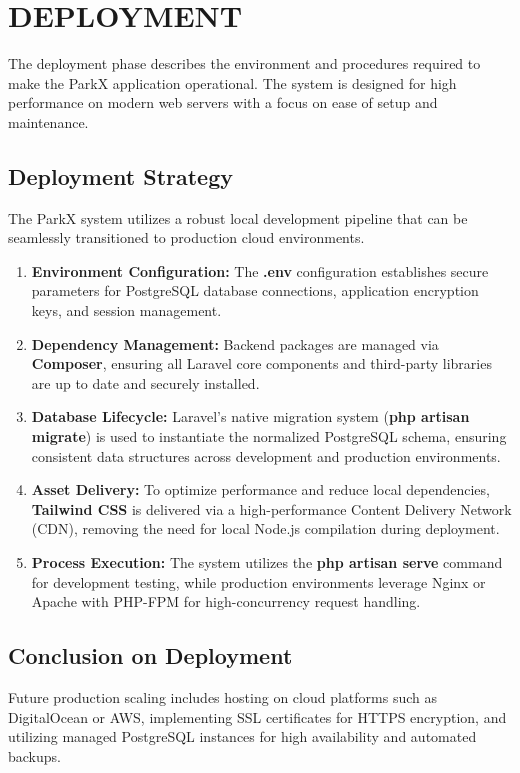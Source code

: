 \chapter{DEPLOYMENT}
The deployment phase describes the environment and procedures required to make the ParkX application operational. The system is designed for high performance on modern web servers with a focus on ease of setup and maintenance.

\section{Deployment Strategy}
The ParkX system utilizes a robust local development pipeline that can be seamlessly transitioned to production cloud environments.

\begin{enumerate}
    \item \textbf{Environment Configuration:} The \textbf{.env} configuration establishes secure parameters for PostgreSQL database connections, application encryption keys, and session management.
    \item \textbf{Dependency Management:} Backend packages are managed via \textbf{Composer}, ensuring all Laravel core components and third-party libraries are up to date and securely installed.
    \item \textbf{Database Lifecycle:} Laravel's native migration system (\textbf{php artisan migrate}) is used to instantiate the normalized PostgreSQL schema, ensuring consistent data structures across development and production environments.
    \item \textbf{Asset Delivery:} To optimize performance and reduce local dependencies, \textbf{Tailwind CSS} is delivered via a high-performance Content Delivery Network (CDN), removing the need for local Node.js compilation during deployment.
    \item \textbf{Process Execution:} The system utilizes the \textbf{php artisan serve} command for development testing, while production environments leverage Nginx or Apache with PHP-FPM for high-concurrency request handling.
\end{enumerate}

\section{Conclusion on Deployment}
Future production scaling includes hosting on cloud platforms such as DigitalOcean or AWS, implementing SSL certificates for HTTPS encryption, and utilizing managed PostgreSQL instances for high availability and automated backups.
